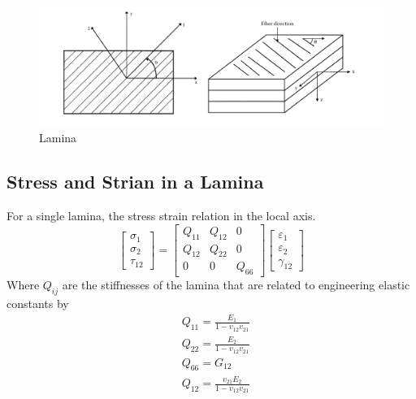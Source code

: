 \documentclass[Afour,sageh,times]{sagej}
\begin{document}
\begin{figure}
	\centering
	\includegraphics[width=\linewidth]{A_laminate_design_images/lamina_local_global_axes.png}
	\caption{Lamina}
  	\label{fig:lamina}
\end{figure}


\subsection{Stress and Strian in a Lamina}
For a single lamina, the stress strain relation in the local axis.
\begin{equation}
    \begin{bmatrix}
        \sigma_1\\
        \sigma_2\\
        \tau_{12}
    \end{bmatrix}
    =
    \begin{bmatrix}
        Q_{11} & Q_{12} & 0\\
        Q_{12} & Q_{22} & 0\\
        0      &  0     & Q_{66}
    \end{bmatrix}
    \begin{bmatrix}
        \varepsilon_1\\
        \varepsilon_2\\
		\gamma_{12}
    \end{bmatrix}
\end{equation}
Where $Q_{ij}$ are the stiffnesses of the lamina that are related to 
engineering elastic constants by
\begin{equation}
    \begin{split}
    &Q_{11}=\frac{E_1}{1-v_{12}v_{21}}\\
    &Q_{22}=\frac{E_2}{1-v_{12}v_{21}}\\
    &Q_{66}=G_{12}\\
    &Q_{12}=\frac{v_{21}E_2}{1-v_{12}v_{21}}\\
    \end{split}
\end{equation}
\end{document}
